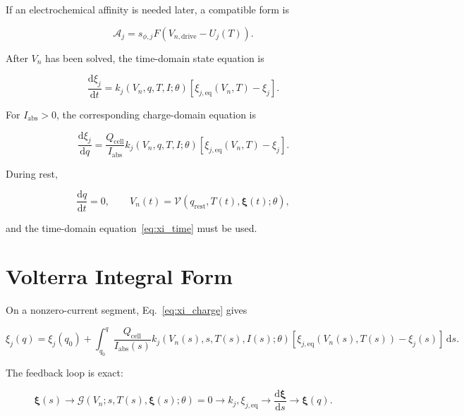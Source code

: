 \documentclass[11pt,a4paper]{article}
\newcommand{\dd}{\mathrm{d}}
\newcommand{\cell}{\mathrm{cell}}
\newcommand{\eq}{\mathrm{eq}}
\newcommand{\drive}{\mathrm{drive}}
\newcommand{\absI}{I_{\mathrm{abs}}}
\begin{document}
If an electrochemical affinity is needed later, a compatible form is

\begin{equation}
\mathcal{A}_j=s_{\phi,j}F\left(V_{n,\drive}-U_j(T)\right).
\label{eq:affinity_interface}
\end{equation}

After \(V_n\) has been solved, the time-domain state equation is

\begin{equation}
\frac{\dd \xi_j}{\dd t}
=
k_j(V_n,q,T,I;\theta)
\left[
\xi_{j,\eq}(V_n,T)-\xi_j
\right].
\label{eq:xi_time}
\end{equation}

For \(\absI>0\), the corresponding charge-domain equation is

\begin{equation}
\frac{\dd \xi_j}{\dd q}
=
\frac{Q_{\cell}}{\absI}
k_j(V_n,q,T,I;\theta)
\left[
\xi_{j,\eq}(V_n,T)-\xi_j
\right].
\label{eq:xi_charge}
\end{equation}

During rest,

\begin{equation}
\frac{\dd q}{\dd t}=0,
\qquad
V_n(t)=\mathcal{V}(q_{\mathrm{rest}},T(t),\bm{\xi}(t);\theta),
\label{eq:rest_root}
\end{equation}

and the time-domain equation~\eqref{eq:xi_time} must be used.

\section{Volterra Integral Form}

On a nonzero-current segment, Eq.~\eqref{eq:xi_charge} gives

\begin{equation}
\xi_j(q)
=
\xi_j(q_0)
+
\int_{q_0}^{q}
\frac{Q_{\cell}}{\absI(s)}
k_j(V_n(s),s,T(s),I(s);\theta)
\left[
\xi_{j,\eq}(V_n(s),T(s))-\xi_j(s)
\right]
\,\dd s.
\label{eq:volterra_form}
\end{equation}

The feedback loop is exact:

\begin{equation}
\bm{\xi}(s)
\rightarrow
\mathcal{G}(V_n;s,T(s),\bm{\xi}(s);\theta)=0
\rightarrow
k_j,\xi_{j,\eq}
\rightarrow
\frac{\dd \bm{\xi}}{\dd s}
\rightarrow
\bm{\xi}(q).
\label{eq:self_consistency_loop}
\end{equation}
\end{document}
